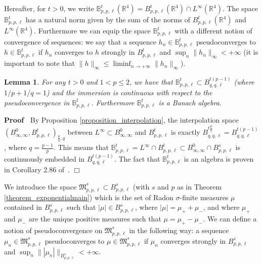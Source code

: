 \documentclass[a4paper,10pt]{article}
\newenvironment{proof}{\noindent\textbf{Proof\ }}{\hspace*{\fill}$\Box$\medskip}
\newtheorem{lemma}{Lemma}
\begin{document}
Hereafter, for $t > 0$, we write $\mathbb{B}^t_{p, p, \ell} (\mathbb{R}^4) =
B^t_{p, p, \ell} (\mathbb{R}^4) \cap L^{\infty} (\mathbb{R}^4)$. The space
$\mathbb{B}^t_{p, p, \ell}$ has a natural norm given by the sum of the norms
of $B^t_{p, p, \ell} (\mathbb{R}^4)$ and $L^{\infty} (\mathbb{R}^4)$.
Furthermore we can equip the space $\mathbb{B}^t_{p, p, \ell}$ with a
different notion of convergence of sequences: we say that a sequence $h_n \in
\mathbb{B}^t_{p, p, \ell}$ pseudoconverges to $h \in \mathbb{B}^t_{p, p,
\ell}$ if $h_n$ converges to $h$ strongly in $B^t_{p, p, \ell}$ and $\sup_n \|
h_n \|_{\infty} < + \infty$ (it is important to note that $\| h \|_{\infty}
\leqslant \liminf_{n \rightarrow + \infty} \| h_n \|_{\infty}$).

\begin{lemma}
  \label{lemma_interpolation}For any $t > 0$ and $1 < p \leqslant 2$, we have
  that $\mathbb{B}^t_{p, p, \ell} \subset B^{t (p - 1)}_{q, q, \ell}$ (where
  $1 / p + 1 / q = 1$) and the immersion is continuous with respect to the
  pseudoconvergence in $\mathbb{B}^t_{p, p, \ell}$. Furthermore
  $\mathbb{B}^t_{p, p, \ell}$ is a Banach algebra.
\end{lemma}

\begin{proof}
  By Proposition \ref{proposition_interpolation}, the interpolation space
  $(B^0_{\infty, \infty}, B^t_{p, p, \ell})_{\frac{p}{q}, q}$ between
  $L^{\infty} \subset B^0_{\infty, \infty}$ and $B^t_{p, p, \ell}$ is exactly
  $B^{t \frac{p}{q}}_{q, q, \ell} = B^{t (p - 1)}_{q, q, \ell}$, where $q =
  \frac{p - 1}{p}$. This means that $\mathbb{B}^t_{p, p, \ell} = L^{\infty}
  \cap B^t_{p, p, \ell} \subset B^0_{\infty, \infty} \cap B^s_{p, p, \ell}$ is
  continuously embedded in $B^{t (p - 1)}_{q, q, \ell}$. The fact that
  $\mathbb{B}_{p, p, \ell}^t$ is an algebra is proven in Corollary 2.86
  of~{\cite{Bahouri2011}}.
\end{proof}

We introduce the space $\mathfrak{M}^s_{p, p, \ell} \subset B^s_{p, p, \ell}$
(with $s$ and $p$ as in Theorem \ref{theorem_exponentialmain}) which is the
set of Radon $\sigma$-finite measures $\mu$ contained in $B^s_{p, p, \ell}$
such that $| \mu | \in B^s_{p, p, \ell}$, where $| \mu | = \mu_+ + \mu_-$, and
where $\mu_+$ and $\mu_-$ are the unique positive measures such that $\mu =
\mu_+ - \mu_-$. We can define a notion of pseudoconvergence on
$\mathfrak{M}^s_{p, p, \ell}$ in the following way: a sequence $\mu_n \in
\mathfrak{M}^s_{p, p, \ell}$ pseudoconverges to $\mu \in \mathfrak{M}^s_{p, p,
\ell}$ if $\mu_n$ converges strongly in $B^s_{p, p, \ell}$ and $\sup_n \| |
\mu_n | \|_{B^s_{p, p, \ell}} < + \infty$.
\end{document}
